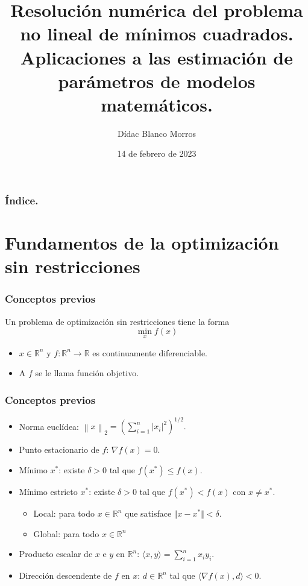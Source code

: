 \documentclass{beamer}
\title
{Resolución numérica del problema no lineal de mínimos cuadrados.
Aplicaciones a las estimación de parámetros de modelos matemáticos.}
\author
{Dídac Blanco Morros}
\date
{14 de febrero de 2023}
\newcommand{\norm}[1]{\left\lVert#1\right\rVert}
\begin{document}
\frame{\titlepage}

\begin{frame}
\frametitle{Índice.} %
\tableofcontents
\end{frame}

\section{Fundamentos de la optimización sin restricciones}
\begin{frame}
    \frametitle{Conceptos previos}
    \begin{block}{}
        Un \alert{problema de optimización sin restricciones} tiene la forma
        \begin{equation*}
            \min_x f(x)
        \end{equation*}
        \end{block}
    \begin{itemize}
        \item $x\in \mathbb{R}^n$ y $f:\mathbb{R}^n \to \mathbb{R}$ es continuamente diferenciable.
        \item A $f$ se le llama función objetivo.
    \end{itemize}
\end{frame}

\begin{frame}
    \frametitle{Conceptos previos}
    \begin{itemize}[label=\textbullet]
    \item Norma euclídea: $
            \norm{x}_2 = \left( \sum_{i=1}^n \vert x_i \vert^2 \right)^{1/2}.
        $
    \item Punto estacionario de $f$: $\nabla f(x) = 0$.
    \item Mínimo $x^*$: existe $\delta > 0$ tal que $f(x^*) \leq f(x)$.
    \item Mínimo estricto $x^*$: existe $\delta > 0$ tal que $f(x^*) < f(x)$ con $x \neq x^*$.
    \begin{itemize}[label=-]
        \item Local: para todo $x \in \mathbb{R}^n$ que satisface $\Vert x - x^* \Vert < \delta$. 
        \item Global: para todo $x \in \mathbb{R}^n$
    \end{itemize}
    \item Producto escalar de $x$ e $y$ en $\mathbb{R}^n$: $\langle x,y \rangle = \sum_{i=1}^n x_i y_i$.
    \item Dirección descendente de $f$ en $x$: $d \in \mathbb{R}^n$ tal que $\langle \nabla f(x), d \rangle < 0$.
    \end{itemize}
\end{frame}
\end{document}
